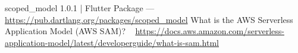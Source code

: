 \documentclass[10pt, a4paper]{article}
\begin{document}
\begin{thebibliography}{9}
scoped\_model 1.0.1 | Flutter Package --- \url{https://pub.dartlang.org/packages/scoped_model}
What is the AWS Serverless Application Model (AWS SAM)? ~ \url{https://docs.aws.amazon.com/serverless-application-model/latest/developerguide/what-is-sam.html}
\end{thebibliography}

\begin{appendix}
	\listoffigures
\end{appendix}
\end{document}
